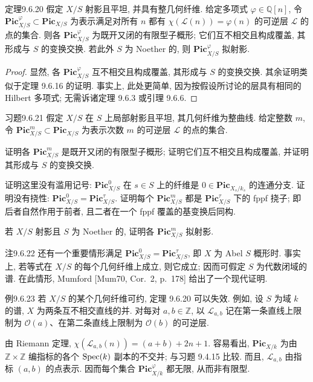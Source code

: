 \begin{origstatement}{定理}{9.6.20}\label{ch09s6:th9620}
假定 $X/S$ 射影且平坦, 并具有整几何纤维. 给定多项式 $\varphi\in\mathbb Q[n]$, 令 $\mathbf{Pic}_{X/S}^{\varphi}\subset\mathbf{Pic}_{X/S}$ 为表示满足对所有 $n$ 都有 $\chi(\mathcal L(n))=\varphi(n)$ 的可逆层 $\mathcal L$ 的点的集合. 则各 $\mathbf{Pic}_{X/S}^{\varphi}$ 为既开又闭的有限型子概形; 它们互不相交且构成覆盖, 其形成与 $S$ 的变换交换. 若此外 $S$ 为 Noether 的, 则 $\mathbf{Pic}_{X/S}^{\varphi}$ 拟射影.
\end{origstatement}
\begin{proof}
显然, 各 $\mathbf{Pic}_{X/S}^{\varphi}$ 互不相交且构成覆盖, 其形成与 $S$ 的变换交换. 其余证明类似于定理 9.6.16 的证明. 事实上, 此处更简单, 因为按假设所讨论的层具有相同的 Hilbert 多项式; 无需诉诸定理 9.6.3 或引理 9.6.6.
\end{proof}

\begin{origstatement}{习题}{9.6.21}\label{ch09s6:ex9621}
假定 $X/S$ 在 $S$ 上局部射影且平坦, 其几何纤维为整曲线. 给定整数 $m$, 令 $\mathbf{Pic}_{X/S}^m\subset\mathbf{Pic}_{X/S}$ 为表示次数 $m$ 的可逆层 $\mathcal L$ 的点的集合.

证明各 $\mathbf{Pic}_{X/S}^m$ 是既开又闭的有限型子概形; 证明它们互不相交且构成覆盖, 并证明其形成与 $S$ 的变换交换.

证明这里没有滥用记号: $\mathbf{Pic}_{X/S}^0$ 在 $s\in S$ 上的纤维是 $0\in\mathbf{Pic}_{X_s/k_s}$ 的连通分支. 证明没有挠性: $\mathbf{Pic}_{X/S}^0=\mathbf{Pic}_{X/S}^{\tau}$. 证明每个 $\mathbf{Pic}_{X/S}^m$ 都是 $\mathbf{Pic}_{X/S}^{\tau}$ 下的 fppf 挠子; 即后者自然作用于前者, 且二者在一个 fppf 覆盖的基变换后同构.

若 $X/S$ 射影且 $S$ 为 Noether 的, 证明各 $\mathbf{Pic}_{X/S}^m$ 拟射影.
\end{origstatement}

\begin{origstatement}{注}{9.6.22}\label{ch09s6:rem9622}
还有一个重要情形满足 $\mathbf{Pic}_{X/S}^0=\mathbf{Pic}_{X/S}^{\tau}$, 即 $X$ 为 Abel $S$ 概形时. 事实上, 若等式在 $X/S$ 的每个几何纤维上成立, 则它成立; 因而可假定 $S$ 为代数闭域的谱. 在此情形, Mumford [Mum70, Cor.~2, p.~178] 给出了一个现代证明.
\end{origstatement}

\begin{origstatement}{例}{9.6.23}\label{ch09s6:ex9623}
若 $X/S$ 的某个几何纤维可约, 定理 9.6.20 可以失效. 例如, 设 $S$ 为域 $k$ 的谱, $X$ 为两条互不相交直线的并. 对每对 $a,b\in\mathbb Z$, 以 $\mathcal L_{a,b}$ 记在第一条直线上限制为 $\mathcal O(a)$、在第二条直线上限制为 $\mathcal O(b)$ 的可逆层.

由 Riemann 定理, $\chi(\mathcal L_{a,b}(n))=(a+b)+2n+1$. 容易看出, $\mathbf{Pic}_{X/k}$ 为由 $\mathbb Z\times\mathbb Z$ 编指标的各个 $\operatorname{Spec}(k)$ 副本的不交并; 与习题 9.4.15 比较. 而且, $\mathcal L_{a,b}$ 由指标 $(a,b)$ 的点表示. 因而每个集合 $\mathbf{Pic}_{X/k}^{\varphi}$ 都无限, 从而非有限型.
\end{origstatement}

